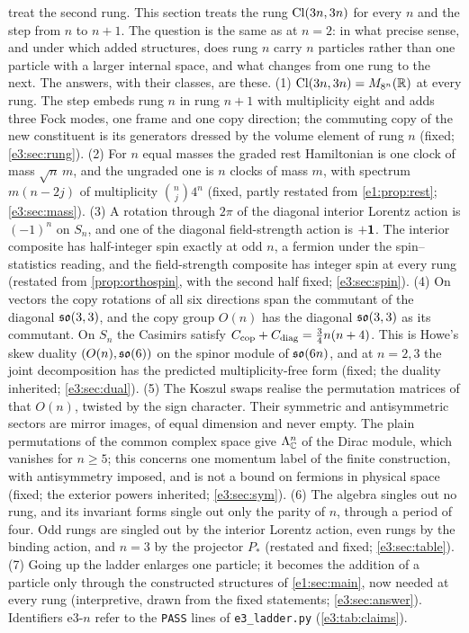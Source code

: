  treat the second rung. This section treats the rung $\mathrm{Cl}(3n,3n)$ for every $n$ and the step from $n$ to
$n+1$. The question is the same as at $n=2$: in what precise sense, and under which added structures, does rung $n$ carry $n$ particles
rather than one particle with a larger internal space, and what changes from one rung to the next. The answers, with their classes, are
these. (1) $\mathrm{Cl}(3n,3n)=M_{8^n}(\mathbb{R})$ at every rung. The step embeds rung $n$ in rung $n+1$ with multiplicity eight and adds three Fock
modes, one frame and one copy direction; the commuting copy of the new constituent is its generators dressed by the volume element of
rung $n$ (fixed; \cref{e3:sec:rung}). (2) For $n$ equal masses the graded rest Hamiltonian is one clock of mass $\sqrt n\,m$, and the
ungraded one is $n$ clocks of mass $m$, with spectrum $m(n-2j)$ of multiplicity $\binom nj4^n$ (fixed, partly restated from
\cref{e1:prop:rest}; \cref{e3:sec:mass}). (3) A rotation through $2\pi$ of the diagonal interior Lorentz action is $(-1)^n$ on $S_n$, and one
of the diagonal field-strength action is $+\mathbf 1$. The interior composite has half-integer spin exactly at odd $n$, a fermion under the
spin--statistics reading, and the field-strength composite has integer spin at every rung (restated from \cref{prop:orthospin}, with the second half fixed; \cref{e3:sec:spin}). (4) On vectors
the copy rotations of all six directions span the commutant of the diagonal $\mathfrak{so}(3,3)$, and the copy group $O(n)$ has the diagonal $\mathfrak{so}(3,3)$
as its commutant. On $S_n$ the Casimirs satisfy $C_{\rm cop}+C_{\rm diag}=\tfrac34n(n+4)$. This is Howe's skew duality $(O(n),\mathfrak{so}(6))$ on the spinor module of $\mathfrak{so}(6n)$, and at
$n=2,3$ the joint decomposition has the predicted multiplicity-free form (fixed; the duality inherited; \cref{e3:sec:dual}). (5) The Koszul
swaps realise the permutation matrices of that $O(n)$, twisted by the sign character. Their symmetric and antisymmetric sectors are mirror images, of equal dimension and
never empty. The plain permutations of the common complex space give $\Lambda^n_{\mathbb{C}}$ of the Dirac module, which vanishes for $n\ge5$; this
concerns one momentum label of the finite construction, with antisymmetry imposed, and is not a bound on fermions in physical space (fixed;
the exterior powers inherited; \cref{e3:sec:sym}). (6) The algebra singles out no rung, and its invariant forms single out only the parity of $n$, through a period of four. Odd rungs are
singled out by the interior Lorentz action, even rungs by the binding action, and $n=3$ by the projector $P_*$ (restated and fixed; \cref{e3:sec:table}). (7) Going up the ladder
enlarges one particle; it becomes the addition of a particle only through the constructed structures of \cref{e1:sec:main}, now needed at every
rung (interpretive, drawn from the fixed statements; \cref{e3:sec:answer}). Identifiers e3-$n$ refer to the \texttt{PASS} lines of
\texttt{e3\_ladder.py} (\cref{e3:tab:claims}).

